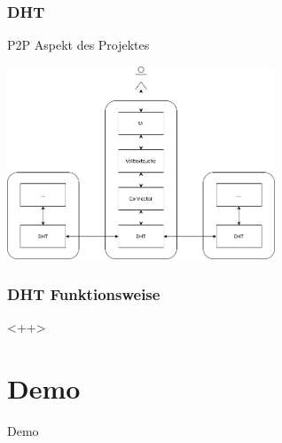 \documentclass{beamer}
\begin{document}
\begin{frame}[allowframebreaks]
  \frametitle{DHT}
  P2P Aspekt des Projektes

  \begin{center}
    \includegraphics[width=8cm]{Komponente-verbunden}
  \end{center}
\end{frame}

\begin{frame}
  \frametitle{DHT Funktionsweise}

  <++>
\end{frame}

\section{Demo}
\begin{frame}
  \begin{center}
    {\Huge Demo}
  \end{center}
\end{frame}
\end{document}
